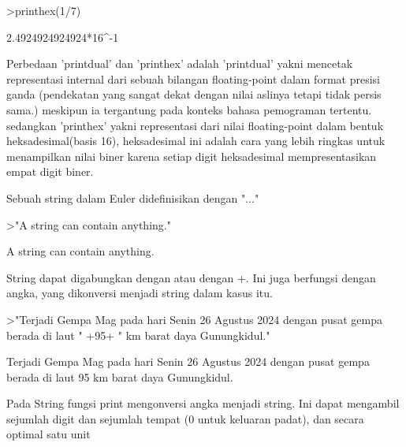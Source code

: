 \documentclass[a4paper,10pt]{article}
\begin{document}
\begin{eulernotebook}
\begin{eulercomment}
\begin{eulercomment}
\begin{eulerprompt}
>printhex(1/7)
\end{eulerprompt}
\begin{euleroutput}
  2.4924924924924*16^-1
\end{euleroutput}
\begin{eulercomment}
Perbedaan 'printdual' dan 'printhex' adalah 'printdual' yakni mencetak
representasi internal dari sebuah bilangan floating-point dalam format
presisi ganda (pendekatan yang sangat dekat dengan nilai aslinya
tetapi tidak persis sama.) meskipun ia tergantung pada konteks bahasa
pemograman tertentu. sedangkan 'printhex' yakni representasi dari
nilai floating-point dalam bentuk heksadesimal(basis 16), heksadesimal
ini adalah cara yang lebih ringkas untuk menampilkan nilai biner
karena setiap digit heksadesimal mempresentasikan empat digit biner.\\
\end{eulercomment}
\eulersubheading{}
\begin{eulercomment}
\end{eulercomment}
\begin{eulercomment}
Sebuah string dalam Euler didefinisikan dengan "..."
\end{eulercomment}
\begin{eulerprompt}
>"A string can contain anything."
\end{eulerprompt}
\begin{euleroutput}
  A string can contain anything.
\end{euleroutput}
\begin{eulercomment}
String dapat digabungkan dengan \textbar{} atau dengan +. Ini juga berfungsi
dengan angka, yang dikonversi menjadi string dalam kasus itu.
\end{eulercomment}
\begin{eulerprompt}
>"Terjadi Gempa Mag pada hari Senin 26 Agustus 2024 dengan pusat gempa berada di laut " +95+ " km barat daya Gunungkidul."
\end{eulerprompt}
\begin{euleroutput}
  Terjadi Gempa Mag pada hari Senin 26 Agustus 2024 dengan pusat gempa berada di laut 95 km barat daya Gunungkidul.
\end{euleroutput}
\begin{eulercomment}
Pada String fungsi print mengonversi angka menjadi string. Ini dapat
mengambil sejumlah digit dan sejumlah tempat (0 untuk keluaran padat),
dan secara optimal satu unit
\end{eulercomment}

\end{eulercomment}
\end{eulercomment}
\end{eulernotebook}
\end{document}
